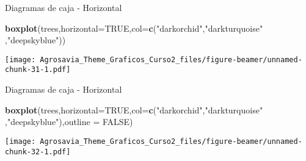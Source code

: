 \documentclass[ignorenonframetext,]{beamer}
\newenvironment{Shaded}{\begin{snugshade}}{\end{snugshade}}
\newcommand{\KeywordTok}[1]{\textcolor[rgb]{0.13,0.29,0.53}{\textbf{#1}}}
\newcommand{\DataTypeTok}[1]{\textcolor[rgb]{0.13,0.29,0.53}{#1}}
\newcommand{\StringTok}[1]{\textcolor[rgb]{0.31,0.60,0.02}{#1}}
\newcommand{\OtherTok}[1]{\textcolor[rgb]{0.56,0.35,0.01}{#1}}
\newcommand{\NormalTok}[1]{#1}
\begin{document}
\begin{frame}[fragile]{Diagramas de caja - Horizontal}

\begin{Shaded}
\begin{Highlighting}[]
\KeywordTok{boxplot}\NormalTok{(trees,}\DataTypeTok{horizontal=}\OtherTok{TRUE}\NormalTok{,}\DataTypeTok{col=}\KeywordTok{c}\NormalTok{(}\StringTok{"darkorchid"}\NormalTok{,}\StringTok{"darkturquoise"}
\NormalTok{                                    ,}\StringTok{"deepskyblue"}\NormalTok{))}
\end{Highlighting}
\end{Shaded}

\texttt{[image: Agrosavia\_Theme\_Graficos\_Curso2\_files/figure-beamer/unnamed-chunk-31-1.pdf]}

\end{frame}

\begin{frame}[fragile]{Diagramas de caja - Horizontal}

\begin{Shaded}
\begin{Highlighting}[]
\KeywordTok{boxplot}\NormalTok{(trees,}\DataTypeTok{horizontal=}\OtherTok{TRUE}\NormalTok{,}\DataTypeTok{col=}\KeywordTok{c}\NormalTok{(}\StringTok{"darkorchid"}\NormalTok{,}\StringTok{"darkturquoise"}
\NormalTok{                             ,}\StringTok{"deepskyblue"}\NormalTok{),}\DataTypeTok{outline =} \OtherTok{FALSE}\NormalTok{)}
\end{Highlighting}
\end{Shaded}

\texttt{[image: Agrosavia\_Theme\_Graficos\_Curso2\_files/figure-beamer/unnamed-chunk-32-1.pdf]}

\end{frame}
\end{document}
